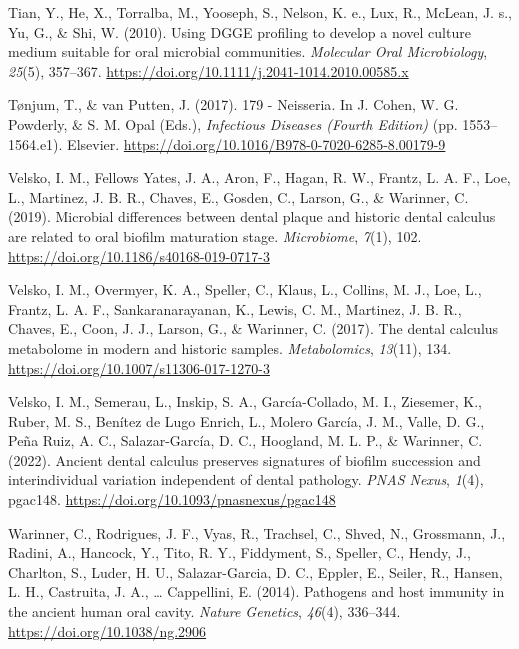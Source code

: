 \documentclass[
]{article}
\newlength{\cslhangindent}
\newlength{\cslentryspacingunit} %
\newenvironment{CSLReferences}[2] %
 {%
  \setlength{\parindent}{0pt}
  \ifodd #1
  \let\oldpar\par
  \def\par{\hangindent=\cslhangindent\oldpar}
  \fi
  \setlength{\parskip}{#2\cslentryspacingunit}
 }%
 {}
\begin{document}
\begin{CSLReferences}{1}{0}
\leavevmode{}%
Tian, Y., He, X., Torralba, M., Yooseph, S., Nelson, K. e., Lux, R.,
McLean, J. s., Yu, G., \& Shi, W. (2010). Using {DGGE} profiling to
develop a novel culture medium suitable for oral microbial communities.
\emph{Molecular Oral Microbiology}, \emph{25}(5), 357--367.
\url{https://doi.org/10.1111/j.2041-1014.2010.00585.x}

\leavevmode{}%
Tønjum, T., \& van Putten, J. (2017). 179 - {Neisseria}. In J. Cohen, W.
G. Powderly, \& S. M. Opal (Eds.), \emph{Infectious {Diseases} ({Fourth
Edition})} (pp. 1553--1564.e1). {Elsevier}.
\url{https://doi.org/10.1016/B978-0-7020-6285-8.00179-9}

\leavevmode{}%
Velsko, I. M., Fellows Yates, J. A., Aron, F., Hagan, R. W., Frantz, L.
A. F., Loe, L., Martinez, J. B. R., Chaves, E., Gosden, C., Larson, G.,
\& Warinner, C. (2019). Microbial differences between dental plaque and
historic dental calculus are related to oral biofilm maturation stage.
\emph{Microbiome}, \emph{7}(1), 102.
\url{https://doi.org/10.1186/s40168-019-0717-3}

\leavevmode{}%
Velsko, I. M., Overmyer, K. A., Speller, C., Klaus, L., Collins, M. J.,
Loe, L., Frantz, L. A. F., Sankaranarayanan, K., Lewis, C. M., Martinez,
J. B. R., Chaves, E., Coon, J. J., Larson, G., \& Warinner, C. (2017).
The dental calculus metabolome in modern and historic samples.
\emph{Metabolomics}, \emph{13}(11), 134.
\url{https://doi.org/10.1007/s11306-017-1270-3}

\leavevmode{}%
Velsko, I. M., Semerau, L., Inskip, S. A., García-Collado, M. I.,
Ziesemer, K., Ruber, M. S., Benítez de Lugo Enrich, L., Molero García,
J. M., Valle, D. G., Peña Ruiz, A. C., Salazar-García, D. C., Hoogland,
M. L. P., \& Warinner, C. (2022). Ancient dental calculus preserves
signatures of biofilm succession and interindividual variation
independent of dental pathology. \emph{PNAS Nexus}, \emph{1}(4),
pgac148. \url{https://doi.org/10.1093/pnasnexus/pgac148}

\leavevmode{}%
Warinner, C., Rodrigues, J. F., Vyas, R., Trachsel, C., Shved, N.,
Grossmann, J., Radini, A., Hancock, Y., Tito, R. Y., Fiddyment, S.,
Speller, C., Hendy, J., Charlton, S., Luder, H. U., Salazar-Garcia, D.
C., Eppler, E., Seiler, R., Hansen, L. H., Castruita, J. A., \ldots{}
Cappellini, E. (2014). Pathogens and host immunity in the ancient human
oral cavity. \emph{Nature Genetics}, \emph{46}(4), 336--344.
\url{https://doi.org/10.1038/ng.2906}


\end{CSLReferences}
\end{document}
